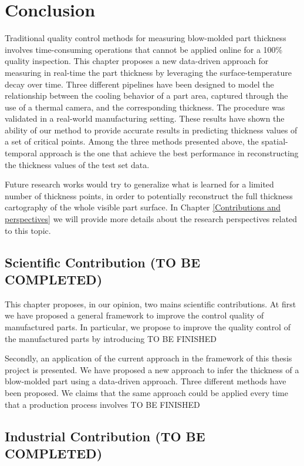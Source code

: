 \section{Conclusion}

Traditional quality control methods for measuring blow-molded part thickness involves time-consuming operations that cannot be applied online for a 100\% quality inspection. This chapter proposes a new data-driven approach for measuring in real-time the part thickness by leveraging the surface-temperature decay over time. Three different pipelines have been designed to model the relationship between the cooling behavior of a part area, captured through the use of a thermal camera, and the corresponding thickness. The procedure was validated in a real-world manufacturing setting. These results have shown the ability of our method to provide accurate results in predicting thickness values of a set of critical points. Among the three methods presented above, the spatial-temporal approach is the one that achieve the best performance in reconstructing the thickness values of the test set data. 

Future research works would try to generalize what is learned for a limited number of thickness points, in order to potentially reconstruct the full thickness cartography of the whole visible part surface. In Chapter \ref{Contributions and perspectives} we will provide more details about the research perspectives related to this topic. 

\subsection{Scientific Contribution (TO BE COMPLETED)}

This chapter proposes, in our opinion, two mains scientific contributions. At first we have proposed a general framework to improve the control quality of manufactured parts. In particular, we propose to improve the quality control of the manufactured parts by introducing TO BE FINISHED  

Secondly, an application of the current approach in the framework of this thesis project is presented. We have proposed a new approach to infer the thickness of a blow-molded part using a data-driven approach. Three different methods have been proposed. We claims that the same approach could be applied every time that a production process involves TO BE FINISHED

\subsection{Industrial Contribution (TO BE COMPLETED)}

